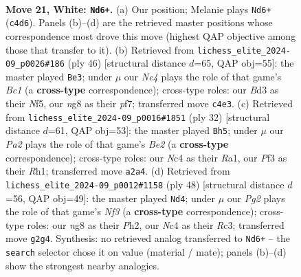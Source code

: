 \documentclass[11pt]{article}
\begin{document}
\clearpage

\begin{figure}[p]\centering
\begin{subfigure}{0.46\textwidth}\centering
\resizebox{\linewidth}{!}{%
\newchessgame
\chessboard[
  setfen={r1b1k1nr/p5pp/2p2b2/5p2/2N2B2/3B1P1P/PPP3P1/R2R2K1 w - - 3 21},
  showmover=false,
  pgfstyle=straightmove, color=movearrow, markmove={c4-d6}
]}
\caption{}
\end{subfigure}\hfill
\begin{subfigure}{0.46\textwidth}\centering
\resizebox{\linewidth}{!}{%
\newchessgame
\chessboard[
  setfen={1r2nr1k/pb3ppp/2p5/4bN2/4P3/8/PP2B1PP/R1B2RK1 w - - 2 24},
  showmover=false,
  pgfstyle=straightmove, color=movearrow, markmove={c1-e3}
]}
\caption{}
\end{subfigure}
\\[4pt]
\begin{subfigure}{0.46\textwidth}\centering
\resizebox{\linewidth}{!}{%
\newchessgame
\chessboard[
  setfen={r3kb1r/p4ppp/b1np4/2p3N1/2P4P/1P6/PB2BPP1/R3K2R w KQkq - 0 17},
  showmover=false,
  pgfstyle=straightmove, color=movearrow, markmove={e2-h5}
]}
\caption{}
\end{subfigure}\hfill
\begin{subfigure}{0.46\textwidth}\centering
\resizebox{\linewidth}{!}{%
\newchessgame
\chessboard[
  setfen={3r2k1/pnrb1p2/1p4pp/3P1p2/2P5/2RB1NP1/P4P1P/2R3K1 w - - 1 25},
  showmover=false,
  pgfstyle=straightmove, color=movearrow, markmove={f3-d4}
]}
\caption{}
\end{subfigure}
\caption{\textbf{Move 21, White: \texttt{Nd6+}.} (a) Our position; Melanie plays \texttt{Nd6+} (\texttt{c4d6}). Panels (b)--(d) are the retrieved master positions whose correspondence most drove this move (highest QAP objective among those that transfer to it). (b) Retrieved from \texttt{lichess\_elite\_2024-09\_p0026\#186} (ply 46) [structural distance $d$=65, QAP obj=55]: the master played \texttt{Be3}; under $\mu$ our \emph{Nc4} plays the role of that game's \emph{Bc1} (a \textbf{cross-type} correspondence); cross-type roles: our \emph{B}d3 as their \emph{N}f5, our \emph{n}g8 as their \emph{p}f7; transferred move \texttt{c4e3}. (c) Retrieved from \texttt{lichess\_elite\_2024-09\_p0016\#1851} (ply 32) [structural distance $d$=61, QAP obj=53]: the master played \texttt{Bh5}; under $\mu$ our \emph{Pa2} plays the role of that game's \emph{Be2} (a \textbf{cross-type} correspondence); cross-type roles: our \emph{N}c4 as their \emph{R}a1, our \emph{P}f3 as their \emph{R}h1; transferred move \texttt{a2a4}. (d) Retrieved from \texttt{lichess\_elite\_2024-09\_p0012\#1158} (ply 48) [structural distance $d$=56, QAP obj=49]: the master played \texttt{Nd4}; under $\mu$ our \emph{Pg2} plays the role of that game's \emph{Nf3} (a \textbf{cross-type} correspondence); cross-type roles: our \emph{n}g8 as their \emph{P}h2, our \emph{N}c4 as their \emph{R}c3; transferred move \texttt{g2g4}. Synthesis: no retrieved analog transferred to \texttt{Nd6+} -- the \texttt{search} selector chose it on value (material / mate); panels (b)--(d) show the strongest nearby analogies.}
\label{fig:thought-m40}
\end{figure}
\end{document}
